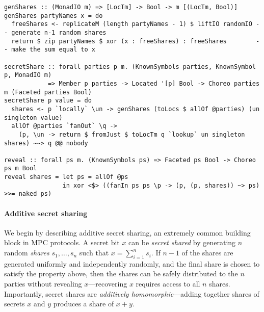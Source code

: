 \documentclass[sigplan,screen,review,anonymous]{acmart}
\newcommand{\inlinecode}[2][haskell]{\texttt{#2}}
\begin{document}
\begin{figure*}
\begin{mdframed}
\begin{verbatim}
genShares :: (MonadIO m) => [LocTm] -> Bool -> m [(LocTm, Bool)]
genShares partyNames x = do
  freeShares <- replicateM (length partyNames - 1) $ liftIO randomIO -- generate n-1 random shares
  return $ zip partyNames $ xor (x : freeShares) : freeShares        -- make the sum equal to x

secretShare :: forall parties p m. (KnownSymbols parties, KnownSymbol p, MonadIO m)
            => Member p parties -> Located '[p] Bool -> Choreo parties m (Faceted parties Bool)
secretShare p value = do
  shares <- p `locally` \un -> genShares (toLocs $ allOf @parties) (un singleton value)
  allOf @parties `fanOut` \q ->
    (p, \un -> return $ fromJust $ toLocTm q `lookup` un singleton shares) ~~> q @@ nobody

reveal :: forall ps m. (KnownSymbols ps) => Faceted ps Bool -> Choreo ps m Bool
reveal shares = let ps = allOf @ps
                in xor <$> ((fanIn ps ps \p -> (p, (p, shares)) ~> ps) >>= naked ps)
\end{verbatim}
\caption{Choreographies for secret sharing \inlinecode{p}'s secret value among \inlinecode{parties}
         and for revealing a secret-shared value.
         \inlinecode{p} constructs secret shares locally (line~9),
         then sends one share to each party (lines~10--11), including themselves.
         The result is a \inlinecode{Faceted} value---each
         party has one secret share of the secret.}
\label{fig:secret-sharing}
\end{mdframed}
\end{figure*}

\paragraph{Additive secret sharing}
We begin by describing additive secret sharing, an extremely common building block in MPC protocols. A secret bit $x$ can be \emph{secret shared} by generating $n$ random \emph{shares} $s_1, \dots, s_n$ such that $x = \sum_{i=1}^n s_i$. If $n-1$ of the shares are generated uniformly and independently randomly, and the final share is chosen to satisfy the property above, then the shares can be safely distributed to the $n$ parties without revealing $x$---recovering $x$ requires access to all $n$ shares. Importantly, secret shares are \emph{additively homomorphic}---adding together shares of secrets $x$ and $y$ produces a share of $x+y$. 
\end{document}
